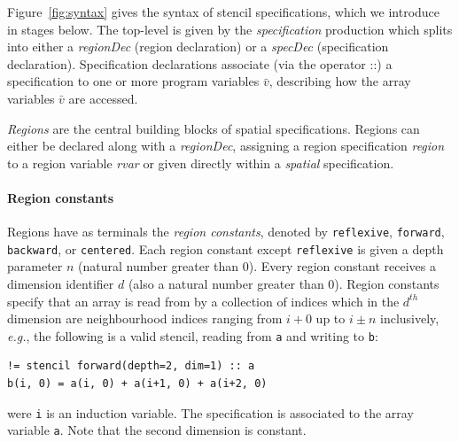 \documentclass[9pt]{sigplanconf}
\newcounter{block}
\theoremstyle{definition}
\newcommand{\eg}{\emph{e.g.}}
\newcommand{\nonterm}[1]{\textit{#1}}
\newcommand{\term}[1]{\texttt{#1}}
\begin{document}
Figure~\ref{fig:syntax} gives the syntax of stencil specifications,
which we introduce in stages below.  The top-level is given by the
\nonterm{specification} production which splits into either a
\nonterm{regionDec} (region declaration) or a \nonterm{specDec}
(specification declaration). Specification declarations associate
(via the operator $\texttt{::}$) a specification to one or more program variables
$\bar{v}$, describing how the array variables $\bar{v}$ are accessed.


\emph{Regions} are the central building blocks of spatial
specifications. Regions can either be declared along with a
\nonterm{regionDec}, assigning a region specification \nonterm{region} to
a region variable \nonterm{rvar} or given directly within a
\nonterm{spatial} specification.

\paragraph{Region constants}

Regions have as terminals the \emph{region constants}, denoted by
\term{reflexive}, \term{forward}, \term{backward}, or \term{centered}. Each
region constant except \term{reflexive} is given a depth parameter $n$ (natural
number greater than 0). Every region constant receives a dimension identifier $d$ (also a
natural number greater than 0). Region constants specify that an array is read
from by a collection of indices which in the $d^{th}$ dimension are
neighbourhood indices ranging from $i + 0$ up to $i \pm n$ inclusively,
\eg{}, the following is a valid stencil, reading from \term{a} and writing to
\term{b}:
\begin{verbatim}
!= stencil forward(depth=2, dim=1) :: a
b(i, 0) = a(i, 0) + a(i+1, 0) + a(i+2, 0)
\end{verbatim}
were \texttt{i} is an induction variable.  The specification
is associated to the array variable \texttt{a}. Note that the second
dimension is constant.
\end{document}
